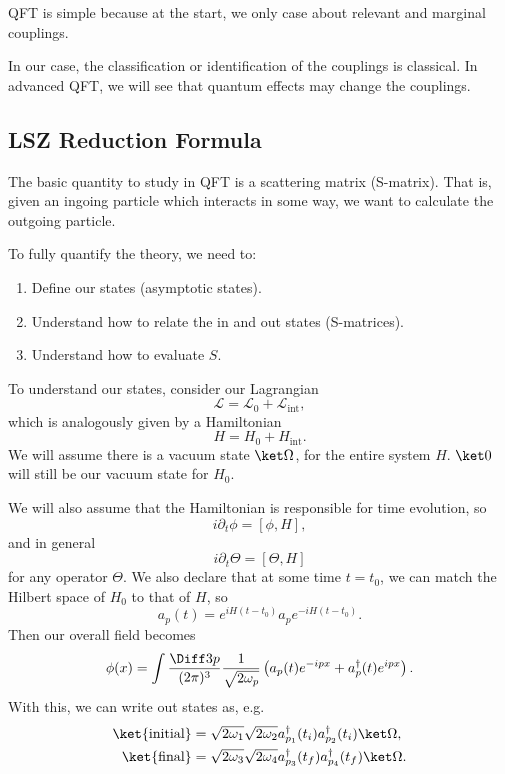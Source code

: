 \documentclass[12pt]{article}
\begin{document}
QFT is simple because at the start, we only case about relevant and marginal couplings.

In our case, the classification or identification of the couplings is classical. In advanced QFT, we will see that quantum effects may change the couplings.

\subsection{LSZ Reduction Formula}%
\label{sub:lsz}

The basic quantity to study in QFT is a scattering matrix (S-matrix). That is, given an ingoing particle which interacts in some way, we want to calculate the outgoing particle.

To fully quantify the theory, we need to:
\begin{enumerate}
	\item Define our states (asymptotic states).
	\item Understand how to relate the in and out states (S-matrices).
	\item Understand how to evaluate $S$.
\end{enumerate}

To understand our states, consider our Lagrangian
\[
\mathcal{L} = \mathcal{L}_0 + \mathcal{L}_{\mathrm{int}},
\]
which is analogously given by a Hamiltonian
\[
H = H_0 + H_{\mathrm{int}}.
\]
We will assume there is a vacuum state $\ket \Omega$, for the entire system $H$. $\ket 0$ will still be our vacuum state for $H_0$.


We will also assume that the Hamiltonian is responsible for time evolution, so
\[
	i \partial_t \phi = [\phi, H],
\]
and in general
\[
	i \partial_t \Theta = [\Theta, H]
\]
for any operator $\Theta$. We also declare that at some time $t = t_0$, we can match the Hilbert space of $H_0$ to that of $H$, so
\[
a_p(t) = e^{iH(t - t_0)} a_p e^{-iH(t - t_0)}.
\]
Then our overall field becomes
\[
	\phi(x) = \int \frac{\Diff 3 p}{(2 \pi)^3} \frac{1}{\sqrt{2 \omega_p}} \left( a_p(t) e^{-i p x} + a_p^{\dagger}(t) e^{ipx} \right).
\]
With this, we can write out states as, e.g.
\begin{align*}
	\ket{\text{initial}} &= \sqrt{2 \omega_1} \sqrt{2 \omega_2} a_{p_1}^{\dagger}(t_i) a_{p_2} ^{\dagger}(t_i) \ket \Omega, \\
	\ket{\text{final}} &= \sqrt{2\omega_3}\sqrt{2\omega_4} a_{p_3}^{\dagger}(t_f) a_{p_4}^{\dagger} (t_f) \ket \Omega.
\end{align*}
\end{document}
